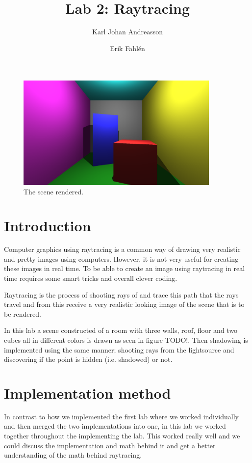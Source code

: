 \documentclass[a4]{article}
\begin{document}
\title{Lab 2: Raytracing}

\author{Karl Johan Andreasson \and Erik Fahlén}

\maketitle

\begin{figure}
    \centering
    \includegraphics[width=10cm]{main720.png}
    \caption{The scene rendered.}
    \label{fig:main}
\end{figure}

\section{Introduction}
Computer graphics using raytracing is a common way of drawing very realistic and
pretty images using computers. However, it is not very useful for creating these
images in real time. To be able to create an image using raytracing in real time
requires some smart tricks and overall clever coding.

Raytracing is the process of shooting rays of and trace this path that the rays
travel and from this receive a very realistic looking image of the scene that is
to be rendered.

In this lab a scene constructed of a room with three walls, roof, floor and two
cubes all in different colors is drawn as seen in figure TODO!. Then shadowing
is implemented using the same manner; shooting rays from the lightsource and
discovering if the point is hidden (i.e. shadowed) or not.


\section{Implementation method}
In contrast to how we implemented the first lab where we worked individually and
then merged the two implementations into one, in this lab we worked together
throughout the implementing the lab. This worked really well and we could
discuss the implementation and math behind it and get a better understanding of
the math behind raytracing.
\end{document}
